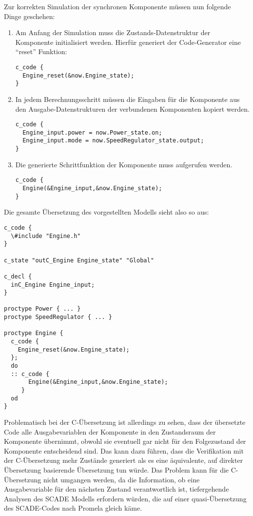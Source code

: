 Zur korrekten Simulation der synchronen Komponente müssen nun folgende Dinge geschehen:
\begin{enumerate}
\item Am Anfang der Simulation muss die Zustands-Datenstruktur der Komponente initialisiert werden.
  Hierfür generiert der Code-Generator eine "`reset"' Funktion:
  \begin{lstlisting}[language=promela]
c_code {
  Engine_reset(&now.Engine_state);
}
  \end{lstlisting}
\item In jedem Berechnungsschritt müssen die Eingaben für die Komponente aus den Aus\-ga\-be-Da\-ten\-struk\-tu\-ren der verbundenen Komponenten kopiert werden.
  \begin{lstlisting}[language=promela]
c_code {
  Engine_input.power = now.Power_state.on;
  Engine_input.mode = now.SpeedRegulator_state.output;
}
  \end{lstlisting}
\item Die generierte Schrittfunktion der Komponente muss aufgerufen werden.
  \begin{lstlisting}[language=promela]
c_code {
  Engine(&Engine_input,&now.Engine_state);
}
  \end{lstlisting}
\end{enumerate}
Die gesamte Übersetzung des vorgestellten Modells sieht also so aus:
\begin{lstlisting}[language=promela]
c_code {
  \#include "Engine.h"
}

c_state "outC_Engine Engine_state" "Global"

c_decl {
  inC_Engine Engine_input;
}

proctype Power { ... }
proctype SpeedRegulator { ... }

proctype Engine {
  c_code {
    Engine_reset(&now.Engine_state);
  };
  do
  :: c_code {
       Engine(&Engine_input,&now.Engine_state);
     }
  od
}
\end{lstlisting}
Problematisch bei der C-Übersetzung ist allerdings zu sehen, dass der übersetzte Code alle Ausgabevariablen der Komponente in den Zustandsraum der Komponente übernimmt, obwohl sie eventuell gar nicht für den Folgezustand der Komponente entscheidend sind.
Das kann dazu führen, dass die Verifikation mit der C-Übersetzung mehr Zustände generiert als es eine äquivalente, auf direkter Übersetzung basierende Übersetzung tun würde.
Das Problem kann für die C-Übersetzung nicht umgangen werden, da die Information, ob eine Ausgabevariable für den nächsten Zustand verantwortlich ist, tiefergehende Analysen des SCADE Modells erfordern würden, die auf einer quasi-Übersetzung des SCADE-Codes nach Promela gleich käme.